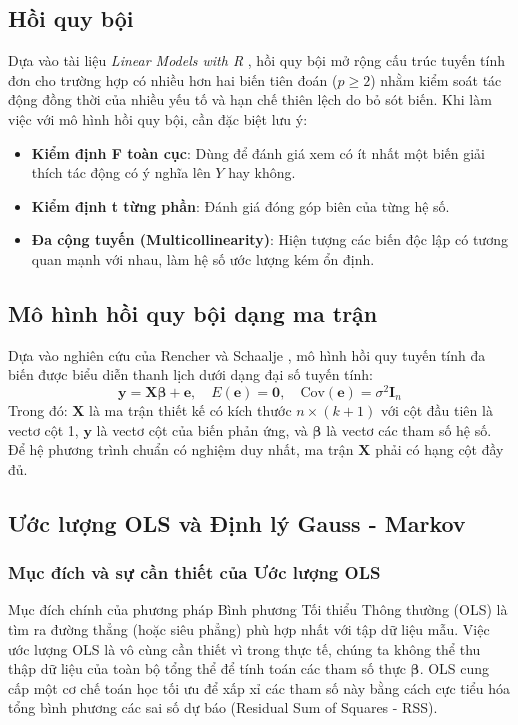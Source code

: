 	\subsection{Hồi quy bội}
	Dựa vào tài liệu \textit{Linear Models with R} \cite{faraway2016}, hồi quy bội mở rộng cấu trúc tuyến tính đơn cho trường hợp có nhiều hơn hai biến tiên đoán ($p \geq 2$) nhằm kiểm soát tác động đồng thời của nhiều yếu tố và hạn chế thiên lệch do bỏ sót biến. Khi làm việc với mô hình hồi quy bội, cần đặc biệt lưu ý:
	\begin{itemize}
		\item \textbf{Kiểm định F toàn cục}: Dùng để đánh giá xem có ít nhất một biến giải thích tác động có ý nghĩa lên $Y$ hay không.
		\item \textbf{Kiểm định t từng phần}: Đánh giá đóng góp biên của từng hệ số.
		\item \textbf{Đa cộng tuyến (Multicollinearity)}: Hiện tượng các biến độc lập có tương quan mạnh với nhau, làm hệ số ước lượng kém ổn định.
	\end{itemize}
	
	\subsection{Mô hình hồi quy bội dạng ma trận}
	Dựa vào nghiên cứu của Rencher và Schaalje \cite{rencher2008linear}, mô hình hồi quy tuyến tính đa biến được biểu diễn thanh lịch dưới dạng đại số tuyến tính:
	\begin{equation}
		\mathbf{y} = \mathbf{X}\boldsymbol{\beta} + \mathbf{e}, \quad E(\mathbf{e}) = \mathbf{0}, \quad \text{Cov}(\mathbf{e}) = \sigma^2 \mathbf{I}_n
	\end{equation}
	Trong đó: $\mathbf{X}$ là ma trận thiết kế có kích thước $n \times (k+1)$ với cột đầu tiên là vectơ cột 1, $\mathbf{y}$ là vectơ cột của biến phản ứng, và $\boldsymbol{\beta}$ là vectơ các tham số hệ số. Để hệ phương trình chuẩn có nghiệm duy nhất, ma trận $\mathbf{X}$ phải có hạng cột đầy đủ.
	
	\subsection{Ước lượng OLS và Định lý Gauss - Markov}
	\subsubsection{Mục đích và sự cần thiết của Ước lượng OLS}
	Mục đích chính của phương pháp Bình phương Tối thiểu Thông thường (OLS) là tìm ra đường thẳng (hoặc siêu phẳng) phù hợp nhất với tập dữ liệu mẫu. Việc ước lượng OLS là vô cùng cần thiết vì trong thực tế, chúng ta không thể thu thập dữ liệu của toàn bộ tổng thể để tính toán các tham số thực $\boldsymbol{\beta}$. OLS cung cấp một cơ chế toán học tối ưu để xấp xỉ các tham số này bằng cách cực tiểu hóa tổng bình phương các sai số dự báo (Residual Sum of Squares - RSS).
	
